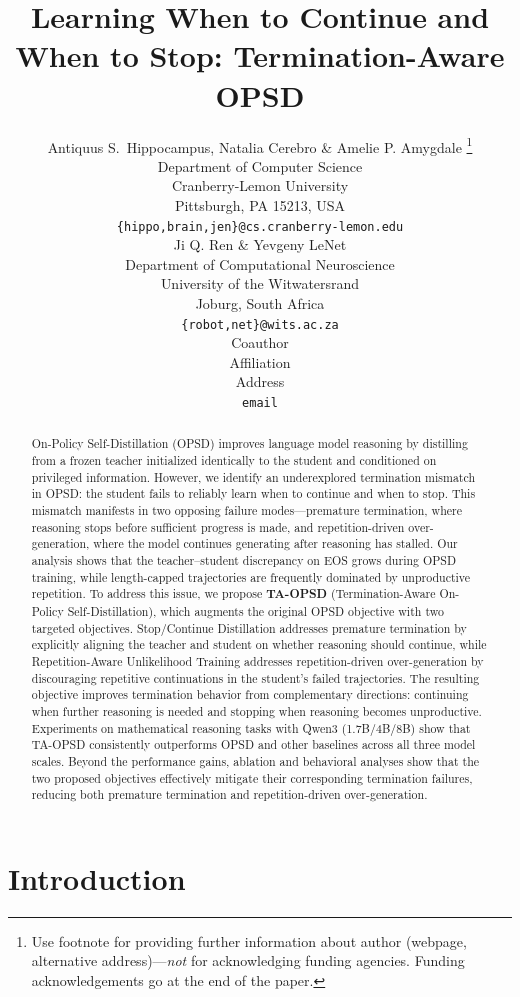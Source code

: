 \documentclass{article} %
\title{Learning When to Continue and \\ When to Stop: Termination-Aware OPSD}
\author{Antiquus S.~Hippocampus, Natalia Cerebro \& Amelie P. Amygdale \thanks{ Use footnote for providing further information
about author (webpage, alternative address)---\emph{not} for acknowledging
funding agencies.  Funding acknowledgements go at the end of the paper.} \\
Department of Computer Science\\
Cranberry-Lemon University\\
Pittsburgh, PA 15213, USA \\
\texttt{\{hippo,brain,jen\}@cs.cranberry-lemon.edu} \\
\And
Ji Q. Ren \& Yevgeny LeNet \\
Department of Computational Neuroscience \\
University of the Witwatersrand \\
Joburg, South Africa \\
\texttt{\{robot,net\}@wits.ac.za} \\
\AND
Coauthor \\
Affiliation \\
Address \\
\texttt{email}
}
\begin{document}
\maketitle

\begin{abstract}
On-Policy Self-Distillation (OPSD) improves language model reasoning by distilling from a frozen teacher initialized identically to the student and conditioned on privileged information. 
However, we identify an underexplored termination mismatch in OPSD: the student fails to reliably learn when to continue and when to stop. This mismatch manifests in two opposing failure modes---premature termination, where reasoning stops before sufficient progress is made, and repetition-driven over-generation, where the model continues generating after reasoning has stalled. Our analysis shows that the teacher--student discrepancy on EOS grows during OPSD training, while length-capped trajectories are frequently dominated by unproductive repetition.
To address this issue, we propose \textbf{TA-OPSD} (Termination-Aware On-Policy Self-Distillation), which augments the original OPSD objective with two targeted objectives. Stop/Continue Distillation addresses premature termination by explicitly aligning the teacher and student on whether reasoning should continue, while Repetition-Aware Unlikelihood Training addresses repetition-driven over-generation by discouraging repetitive continuations in the student's failed trajectories. The resulting objective improves termination behavior from complementary directions: continuing when further reasoning is needed and stopping when reasoning becomes unproductive.
Experiments on mathematical reasoning tasks with Qwen3 (1.7B/4B/8B) show that TA-OPSD consistently outperforms OPSD and other baselines across all three model scales. Beyond the performance gains, ablation and behavioral analyses show that the two proposed objectives effectively mitigate their corresponding termination failures, reducing both premature termination and repetition-driven over-generation.
\end{abstract}

\section{Introduction}
\label{sec:introduction}
\end{document}
